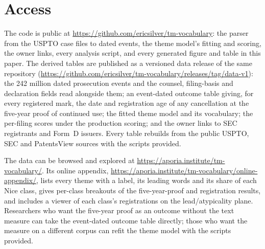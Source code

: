 \section{Access}\label{sec:access}

The code is public at \url{https://github.com/ericsilver/tm-vocabulary}:
the parser from the USPTO case files to dated events, the theme model's
fitting and scoring, the owner links, every analysis script, and every
generated figure and table in this paper. The derived tables are
published as a versioned data release of the same repository
(\url{https://github.com/ericsilver/tm-vocabulary/releases/tag/data-v1}):
the 242 million dated prosecution events and the counsel, filing-basis
and declaration fields read alongside them; an event-dated outcome table
giving, for every registered mark, the date and registration age of any
cancellation at the five-year proof of continued use; the fitted theme
model and its vocabulary; the per-filing scores under the production
scoring; and the owner links to SEC registrants and Form~D issuers.
Every table rebuilds from the public USPTO, SEC and PatentsView sources
with the scripts provided.

The data can be browsed and explored at
\url{https://aporia.institute/tm-vocabulary/}. Its online appendix,
\url{https://aporia.institute/tm-vocabulary/online-appendix/}, lists every
theme with a label, its leading words and its share of each Nice class,
gives per-class breakouts of the five-year-proof and registration
results, and includes a viewer of each class's registrations on the
lead/atypicality plane. Researchers who want the five-year proof as an
outcome without the text measure can take the event-dated outcome table
directly; those who want the measure on a different corpus can refit the
theme model with the scripts provided.
